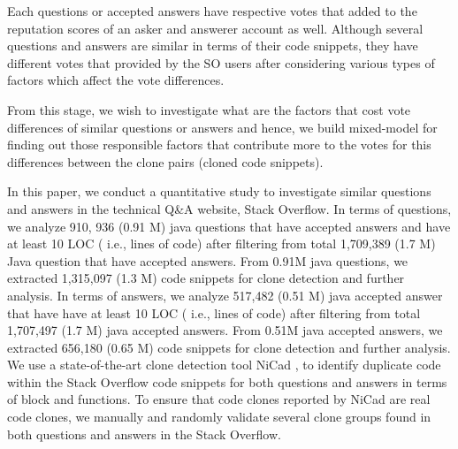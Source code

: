 \documentclass[conference]{IEEEtran}
\begin{document}
	Each questions or accepted answers have respective votes that added to the reputation scores of an asker and answerer account as well. Although several questions and answers are similar in terms of their code snippets, they have different votes that provided by the SO users after considering various types of factors which affect the vote differences. 
	
	From this stage, we wish to investigate what are the factors that cost vote differences of similar questions or answers and hence, we build mixed-model for finding out those responsible factors that contribute more to the votes for this differences between the clone pairs (cloned code snippets). 
	
	In this paper, we conduct a quantitative study to investigate similar questions and answers in the technical Q\&A website, Stack Overflow. In terms of questions, we analyze 910, 936 (0.91 M) java questions that have accepted answers and have at least 10 LOC ( i.e., lines of code) after filtering from total 1,709,389 (1.7 M) Java question that have accepted answers. From 0.91M java questions, we extracted 1,315,097 (1.3 M) code snippets for clone detection and further analysis. In terms of answers, we analyze 517,482 (0.51 M) java accepted answer that have have at least 10 LOC ( i.e., lines of code) after filtering from total 1,707,497 (1.7 M) java accepted answers. From 0.51M java accepted answers, we extracted 656,180 (0.65 M) code snippets for clone detection and further analysis. We use a state-of-the-art clone detection tool \cite{b6} NiCad \cite{b7}, to identify duplicate code within the Stack Overflow code snippets for both questions and answers in terms of block and functions. To ensure that code clones reported by NiCad are real code clones, we manually and randomly validate several clone groups found in both questions and answers in the Stack Overflow. 
	
\end{document}
